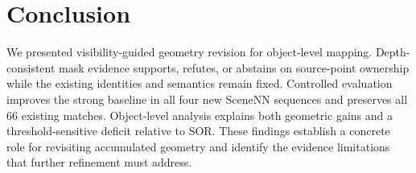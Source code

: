 \section{Conclusion}
We presented visibility-guided geometry revision for object-level mapping. Depth-consistent mask evidence supports, refutes, or abstains on source-point ownership while the existing identities and semantics remain fixed. Controlled evaluation improves the strong baseline in all four new SceneNN sequences and preserves all 66 existing matches. Object-level analysis explains both geometric gains and a threshold-sensitive deficit relative to SOR. These findings establish a concrete role for revisiting accumulated geometry and identify the evidence limitations that further refinement must address.
